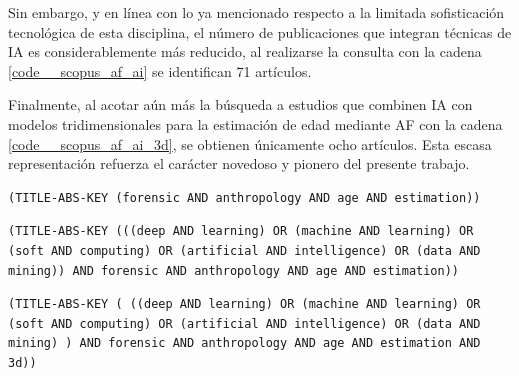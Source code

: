 Sin embargo, y en línea con lo ya mencionado respecto a la limitada sofisticación tecnológica de esta disciplina, el número de publicaciones que integran técnicas de IA es considerablemente más reducido, al realizarse la consulta con la cadena \ref{code__scopus_af_ai} se identifican 71 artículos.

Finalmente, al acotar aún más la búsqueda a estudios que combinen IA con modelos tridimensionales para la estimación de edad mediante AF con la cadena \ref{code__scopus_af_ai_3d}, se obtienen únicamente ocho artículos. Esta escasa representación refuerza el carácter novedoso y pionero del presente trabajo.

\begin{lstlisting}[caption={Cadena de búsqueda de \textit{Scopus} para obtener publicaciones de AF que referencian la estimación de la edad.}, captionpos=b, label=code__scopus_af, style=Consola]
(TITLE-ABS-KEY (forensic AND anthropology AND age AND estimation))
\end{lstlisting}
            
\begin{lstlisting}[caption={Cadena de búsqueda de \textit{Scopus} para obtener publicaciones de AF que referencian la estimación de la edad y hacen uso de alguna técnica de IA}, captionpos=b, label=code__scopus_af_ai, style=Consola]
(TITLE-ABS-KEY (((deep AND learning) OR (machine AND learning) OR (soft AND computing) OR (artificial AND intelligence) OR (data AND mining)) AND forensic AND anthropology AND age AND estimation))
\end{lstlisting}
            
\begin{lstlisting}[caption={Cadena de búsqueda de \textit{Scopus} para obtener publicaciones de AF que referencian la estimación de la edad, hacen uso de alguna técnica de IA y utilizan datos 3D.}, captionpos=b, label=code__scopus_af_ai_3d, style=Consola]
(TITLE-ABS-KEY ( ((deep AND learning) OR (machine AND learning) OR (soft AND computing) OR (artificial AND intelligence) OR (data AND mining) ) AND forensic AND anthropology AND age AND estimation AND 3d))
\end{lstlisting}

